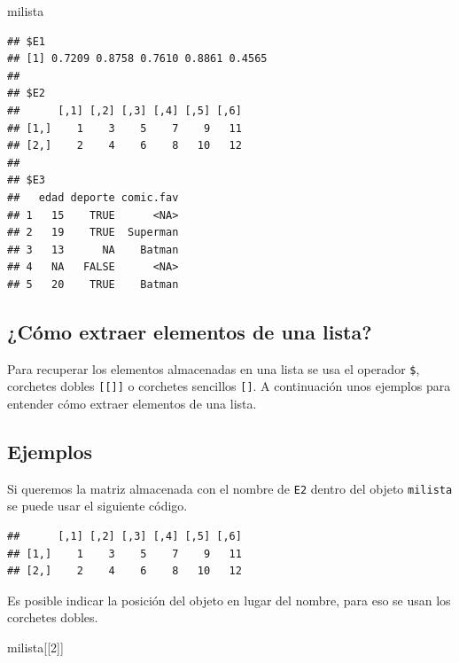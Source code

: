 \documentclass[10pt,]{krantz}
\makeatletter
\newenvironment{Shaded}{\begin{snugshade}}{\end{snugshade}}
\newcommand{\DecValTok}[1]{\textcolor[rgb]{0.00,0.00,0.81}{{#1}}}
\newcommand{\NormalTok}[1]{{#1}}
\newenvironment{kframe}{%
\medskip{}
\setlength{\fboxsep}{.8em}
 \def\at@end@of@kframe{}%
 \ifinner\ifhmode%
  \def\at@end@of@kframe{\end{minipage}}%
  \begin{minipage}{\columnwidth}%
 \fi\fi%
 \def\FrameCommand##1{\hskip\@totalleftmargin \hskip-\fboxsep
 \colorbox{shadecolor}{##1}\hskip-\fboxsep
     \hskip-\linewidth \hskip-\@totalleftmargin \hskip\columnwidth}%
 \MakeFramed {\advance\hsize-\width
   \@totalleftmargin\z@ \linewidth\hsize
   \@setminipage}}%
 {\par\unskip\endMakeFramed%
 \at@end@of@kframe}
\renewenvironment{Shaded}{\begin{kframe}}{\end{kframe}}
\makeatother
\begin{document}
\begin{Shaded}
\begin{Highlighting}[]
\NormalTok{milista}
\end{Highlighting}
\end{Shaded}

\begin{verbatim}
## $E1
## [1] 0.7209 0.8758 0.7610 0.8861 0.4565
## 
## $E2
##      [,1] [,2] [,3] [,4] [,5] [,6]
## [1,]    1    3    5    7    9   11
## [2,]    2    4    6    8   10   12
## 
## $E3
##   edad deporte comic.fav
## 1   15    TRUE      <NA>
## 2   19    TRUE  Superman
## 3   13      NA    Batman
## 4   NA   FALSE      <NA>
## 5   20    TRUE    Batman
\end{verbatim}

\subsection{¿Cómo extraer elementos de una
lista?}\label{como-extraer-elementos-de-una-lista}

Para recuperar los elementos almacenadas en una lista se usa el operador
\texttt{\$}, corchetes dobles \texttt{{[}{[}{]}{]}} o corchetes
sencillos \texttt{{[}{]}}. A continuación unos ejemplos para entender
cómo extraer elementos de una lista.

\subsection*{Ejemplos}\label{ejemplos-1}


Si queremos la matriz almacenada con el nombre de \texttt{E2} dentro del
objeto \texttt{milista} se puede usar el siguiente código.

\begin{Shaded}
\end{Shaded}

\begin{verbatim}
##      [,1] [,2] [,3] [,4] [,5] [,6]
## [1,]    1    3    5    7    9   11
## [2,]    2    4    6    8   10   12
\end{verbatim}

Es posible indicar la posición del objeto en lugar del nombre, para eso
se usan los corchetes dobles.

\begin{Shaded}
\begin{Highlighting}[]
\NormalTok{milista[[}\DecValTok{2}\NormalTok{]]}
\end{Highlighting}
\end{Shaded}
\end{document}

